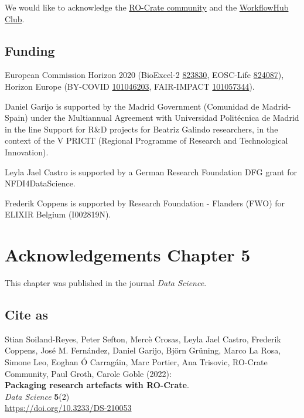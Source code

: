 We would like to acknowledge the
\href{https://www.researchobject.org/ro-crate/community.html}{RO-Crate
community} and the
\href{https://about.workflowhub.eu/project/acknowledgements/}{WorkflowHub
Club}.

\hypertarget{funding-1}{%
\subsection*{Funding}\label{funding-1}}

European Commission Horizon 2020 (BioExcel-2
\href{https://cordis.europa.eu/project/id/823830}{823830}, EOSC-Life
\href{https://cordis.europa.eu/project/id/824087}{824087}), Horizon
Europe (BY-COVID
\href{https://cordis.europa.eu/project/id/101046203}{101046203},
FAIR-IMPACT
\href{https://cordis.europa.eu/project/id/101057344}{101057344}).

Daniel Garijo is supported by the Madrid Government (Comunidad de
Madrid-Spain) under the Multiannual Agreement with Universidad
Politécnica de Madrid in the line Support for R\&D projects for Beatriz
Galindo researchers, in the context of the V PRICIT (Regional Programme
of Research and Technological Innovation).

Leyla Jael Castro is supported by a German Research Foundation DFG grant
for NFDI4DataScience.

Frederik Coppens is supported by Research Foundation - Flanders (FWO)
for ELIXIR Belgium (I002819N).



\section{Acknowledgements Chapter 5}

This chapter was published in the journal \emph{Data Science}.

\subsection*{Cite as}

Stian Soiland-Reyes, Peter Sefton, Mercè Crosas, Leyla Jael Castro,
Frederik Coppens, José M. Fernández, Daniel Garijo, Björn Grüning, Marco
La Rosa, Simone Leo, Eoghan Ó Carragáin, Marc Portier, Ana Trisovic,
RO-Crate Community, Paul Groth, Carole Goble (2022):\\
\textbf{Packaging research artefacts with RO-Crate}.\\
\emph{Data Science} \textbf{5}(2)\\
\url{https://doi.org/10.3233/DS-210053}

